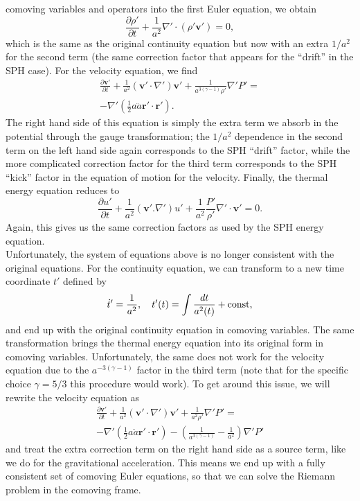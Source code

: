 comoving variables and operators into the first Euler equation, we
obtain
\begin{equation}
\frac{\partial{} \rho{}'}{\partial{} t} + \frac{1}{a^2} \nabla{}' \cdot \left(
\rho{}' \mathbf{v}' \right) = 0,
\end{equation}
which is the same as the original continuity equation but now with an extra
$1/a^2$ for the second term (the same correction factor that appears
for the ``drift'' in the SPH case). For the velocity equation, we find
\begin{multline}
\frac{\partial{} \mathbf{v}'}{\partial{} t} + \frac{1}{a^2} \left( \mathbf{v}' \cdot
\nabla{}' \right) \mathbf{v}' + \frac{1}{a^{3(\gamma{} - 1)}\rho{}'}
\nabla{}' P' = \\
- \nabla{}' \left( \frac{1}{2} a \ddot{a} \mathbf{r}'\cdot\mathbf{r}'
\right).
\end{multline}
The right hand side of this equation is simply the extra term we absorb in the
potential through the gauge transformation; the $1/a^2$ dependence in the
second term on the left hand side again corresponds to the SPH ``drift'' factor,
while the more complicated correction factor for the third term corresponds
to the SPH ``kick'' factor in the equation of motion for the
velocity. Finally, the thermal energy equation reduces to
\begin{equation}
\frac{\partial{} u'}{\partial{} t} + \frac{1}{a^2} \left( \mathbf{v}' .
\nabla{}' \right) u' + \frac{1}{a^2} \frac{P'}{\rho{}'} \nabla{}' \cdot \mathbf{v}'
= 0.
\end{equation}
Again, this gives us the same correction factors as used by the SPH energy
equation.\\

Unfortunately, the system of equations above is no longer consistent with the
original equations. For the continuity equation, we can transform to a new
time coordinate $t'$ defined by
\begin{equation}
\dot{t}' = \frac{1}{a^2}, \quad{} t'(t) = \int \frac{dt}{a^2(t)} + {\rm{}const,}
\end{equation}
and end up with the original continuity equation in comoving variables. The
same transformation brings the thermal energy equation into its original form
in comoving variables. Unfortunately, the same does not work for the velocity
equation due to the $a^{-3(\gamma{}-1)}$ factor in the third term (note that
for the specific choice $\gamma{}=5/3$ this procedure would work).
To get around this issue, we will rewrite the velocity equation as
\begin{multline}
\frac{\partial{} \mathbf{v}'}{\partial{} t} + \frac{1}{a^2} \left(
\mathbf{v}' \cdot
\nabla{}' \right) \mathbf{v}' + \frac{1}{a^2\rho{}'}
\nabla{}' P' = \\
- \nabla{}' \left( \frac{1}{2} a \ddot{a} \mathbf{r}'\cdot\mathbf{r}'
\right) - \left(\frac{1}{a^{3(\gamma{} - 1)}} - \frac{1}{a^2} \right)
\nabla{}'P'
\end{multline}
and treat the extra correction term on the right hand side as a source term,
like we do for the gravitational acceleration. This means we end up with
a fully consistent set of comoving Euler equations, so that we can solve the
Riemann problem in the comoving frame.

